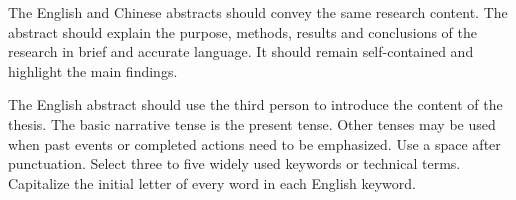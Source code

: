 \begin{enabstract}
The English and Chinese abstracts should convey the same research content. The abstract should explain the purpose, methods, results and conclusions of the research in brief and accurate language. It should remain self-contained and highlight the main findings.

The English abstract should use the third person to introduce the content of the thesis. The basic narrative tense is the present tense. Other tenses may be used when past events or completed actions need to be emphasized. Use a space after punctuation. Select three to five widely used keywords or technical terms. Capitalize the initial letter of every word in each English keyword.
\end{enabstract}

